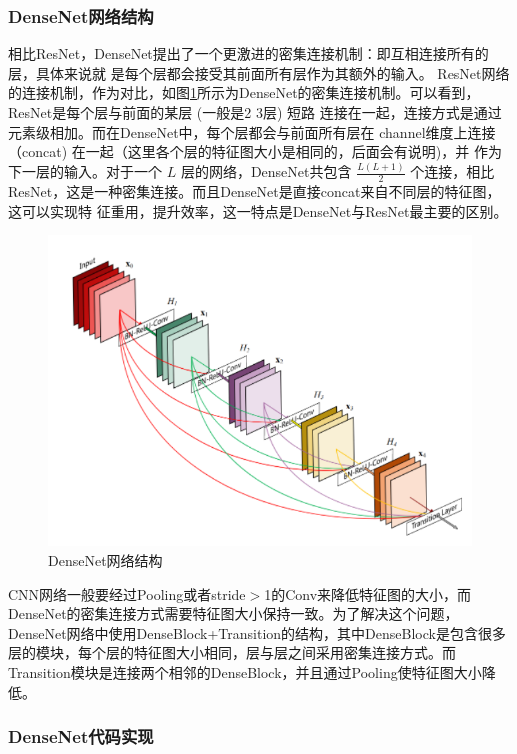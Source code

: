 \documentclass[UTF8,a4paper,10pt]{ctexart}
\begin{document}
\subsubsection{DenseNet网络结构}

相比ResNet，DenseNet提出了一个更激进的密集连接机制：即互相连接所有的层，具体来说就 是每个层都会接受其前面所有层作为其额外的输入。
ResNet网络的连接机制，作为对比，如图\ref{fig:1}所示为DenseNet的密集连接机制。可以看到，ResNet是每个层与前面的某层 (一般是2 3层) 短路 连接在一起，连接方式是通过元素级相加。而在DenseNet中，每个层都会与前面所有层在 channel维度上连接（concat) 在一起（这里各个层的特征图大小是相同的，后面会有说明)，并 作为下一层的输入。对于一个 $L$ 层的网络，DenseNet共包含 $\frac{L(L+1)}{2}$ 个连接，相比
ResNet，这是一种密集连接。而且DenseNet是直接concat来自不同层的特征图，这可以实现特 征重用，提升效率，这一特点是DenseNet与ResNet最主要的区别。


\begin{figure}[H]
    \centering
    \includegraphics[scale=0.5]{4.png}
    \caption{DenseNet网络结构}
    \label{fig:1}
\end{figure}

CNN网络一般要经过Pooling或者stride$>$1的Conv来降低特征图的大小，而DenseNet的密集连接方式需要特征图大小保持一致。为了解决这个问题，DenseNet网络中使用DenseBlock+Transition的结构，其中DenseBlock是包含很多层的模块，每个层的特征图大小相同，层与层之间采用密集连接方式。而Transition模块是连接两个相邻的DenseBlock，并且通过Pooling使特征图大小降低。


\subsubsection{DenseNet代码实现}
\end{document}
